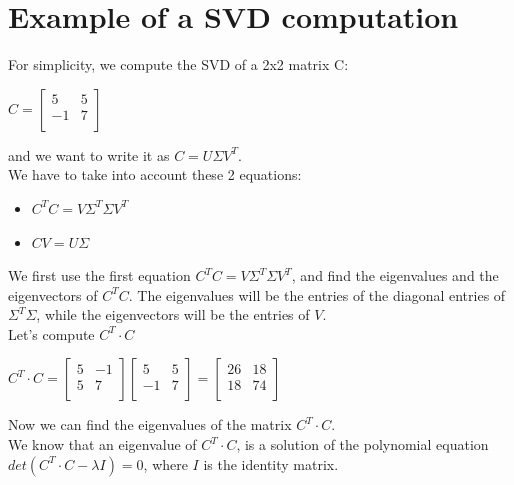 \section{Example of a SVD computation}

For simplicity, we compute the SVD of a 2x2 matrix C:
\begin{center}
	$ 
	C=\begin{bmatrix}
	5 &   5 \\
-1  &  7 \\
	\end{bmatrix}$
\end{center}
and we want to write it as $ C=U\Sigma V^{T} $.\\
We have to take into account these 2 equations:
\begin{itemize}
	\item $ C^T C = V\Sigma^T\Sigma V^T$
	\item $CV=U\Sigma$
\end{itemize}
We first use the first equation  $ C^T C = V\Sigma^T\Sigma V^T$, and find the eigenvalues and the eigenvectors of $C^T C $.
The eigenvalues will be the entries of the diagonal entries of $ \Sigma^T\Sigma $, while the eigenvectors will be the entries of $ V $.\\
Let's compute $ C^T \cdot C $\\
\begin{center}
	$ C^T \cdot C =\begin{bmatrix}
5 &   -1 \\
5  &  7 \\
\end{bmatrix}\begin{bmatrix}
5 &   5 \\
-1  &  7 \\
\end{bmatrix}=\begin{bmatrix}
26 &   18 \\
18  &  74 \\
\end{bmatrix}$\\
\end{center}
Now we can find the eigenvalues of the matrix $ C^T \cdot C $.\\
We know that an eigenvalue of $ C^T \cdot C $, is a solution of the polynomial equation $det( C^T \cdot C-\lambda I)=0 $, where $ I $ is the identity matrix.\\
